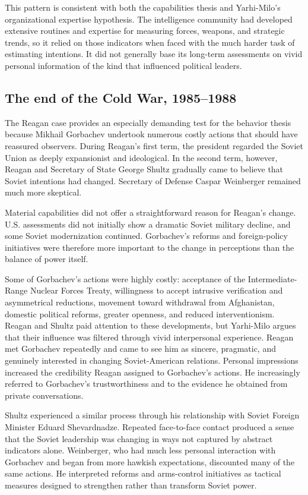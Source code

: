 This pattern is consistent with both the capabilities thesis and Yarhi-Milo's organizational expertise hypothesis. The intelligence community had developed extensive routines and expertise for measuring forces, weapons, and strategic trends, so it relied on those indicators when faced with the much harder task of estimating intentions. It did not generally base its long-term assessments on vivid personal information of the kind that influenced political leaders.

\subsection{The end of the Cold War, 1985--1988}

The Reagan case provides an especially demanding test for the behavior thesis because Mikhail Gorbachev undertook numerous costly actions that should have reassured observers. During Reagan's first term, the president regarded the Soviet Union as deeply expansionist and ideological. In the second term, however, Reagan and Secretary of State George Shultz gradually came to believe that Soviet intentions had changed. Secretary of Defense Caspar Weinberger remained much more skeptical.

Material capabilities did not offer a straightforward reason for Reagan's change. U.S. assessments did not initially show a dramatic Soviet military decline, and some Soviet modernization continued. Gorbachev's reforms and foreign-policy initiatives were therefore more important to the change in perceptions than the balance of power itself.

Some of Gorbachev's actions were highly costly: acceptance of the Intermediate-Range Nuclear Forces Treaty, willingness to accept intrusive verification and asymmetrical reductions, movement toward withdrawal from Afghanistan, domestic political reforms, greater openness, and reduced interventionism. Reagan and Shultz paid attention to these developments, but Yarhi-Milo argues that their influence was filtered through vivid interpersonal experience. Reagan met Gorbachev repeatedly and came to see him as sincere, pragmatic, and genuinely interested in changing Soviet-American relations. Personal impressions increased the credibility Reagan assigned to Gorbachev's actions. He increasingly referred to Gorbachev's trustworthiness and to the evidence he obtained from private conversations.

Shultz experienced a similar process through his relationship with Soviet Foreign Minister Eduard Shevardnadze. Repeated face-to-face contact produced a sense that the Soviet leadership was changing in ways not captured by abstract indicators alone. Weinberger, who had much less personal interaction with Gorbachev and began from more hawkish expectations, discounted many of the same actions. He interpreted reforms and arms-control initiatives as tactical measures designed to strengthen rather than transform Soviet power.

